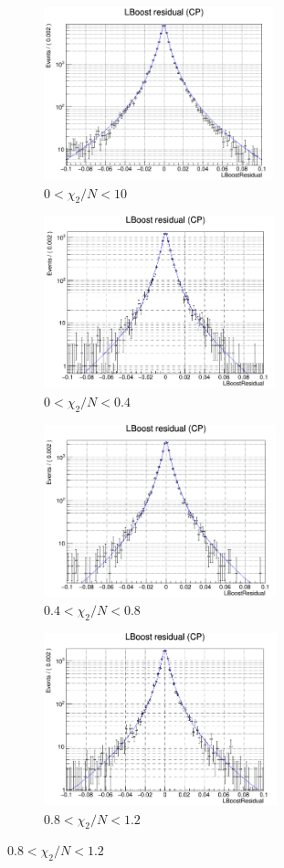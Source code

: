 \begin{figure}[H]
	\begin{subfigure}{0.5\linewidth}
		\caption{$0<\chi_2/N<10$}
		\includegraphics[height=5cm]{figures/residual0_10}
		
	\end{subfigure}
	\begin{subfigure}{0.5\linewidth}
		\caption{$0<\chi_2/N<0.4$}
		\includegraphics[height=5cm]{figures/residual0_0.4}
	\end{subfigure}
	
	
	\begin{subfigure}{0.5\linewidth}
		\caption{$0.4<\chi_2/N<0.8$}
		\includegraphics[height=5cm]{figures/residual0.4_0.8}
	\end{subfigure}
	\begin{subfigure}{0.5\linewidth}
		\caption{$0.8<\chi_2/N<1.2$}
		\includegraphics[height=5cm]{figures/residual0.8_1.2}
	\end{subfigure}
	

\end{figure}
